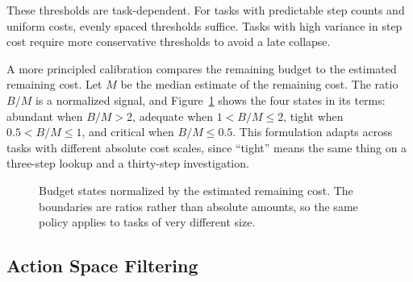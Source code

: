 \documentclass[11pt]{book}
\begin{document}
These thresholds are task-dependent. For tasks with predictable step counts and uniform costs, evenly spaced thresholds suffice. Tasks with high variance in step cost require more conservative thresholds to avoid a late collapse.

A more principled calibration compares the remaining budget to the estimated remaining cost. Let $M$ be the median estimate of the remaining cost. The ratio $B/M$ is a normalized signal, and Figure~\ref{fig:budget-bands} shows the four states in its terms: abundant when $B/M > 2$, adequate when $1 < B/M \leq 2$, tight when $0.5 < B/M \leq 1$, and critical when $B/M \leq 0.5$. This formulation adapts across tasks with different absolute cost scales, since ``tight'' means the same thing on a three-step lookup and a thirty-step investigation.

\begin{figure}[htbp]
\centering
{}
\caption{Budget states normalized by the estimated remaining cost. The boundaries are ratios rather than absolute amounts, so the same policy applies to tasks of very different size.}
\label{fig:budget-bands}
\end{figure}

\subsection{Action Space Filtering}
\end{document}

